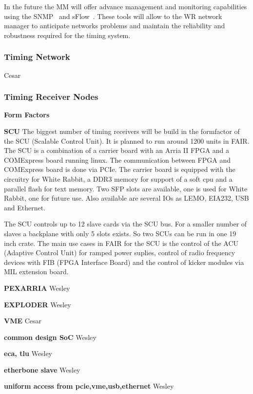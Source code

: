 In the future the MM will offer advance management and monitoring capabilities
using the SNMP~\cite{snmp} and sFlow~\cite{sflow}. These tools will allow to the 
WR network manager to anticipate networks problems and maintain the reliability
and robustness required for the timing system.


\subsubsection{Timing Network}

Cesar

\subsubsection{Timing Receiver Nodes}


\textbf{Form Factors}

\textbf{SCU}
The biggest number of timing receivers will be build in the formfactor
of the SCU (Scalable Control Unit).
It is planned to run around 1200 units in FAIR.
The SCU is a combination of a carrier board with an Arria II FPGA and a
COMExpress board running
linux. The communication between FPGA and COMExpress board is done via
PCIe. The carrier board is
equipped with the circuitry for White Rabbit, a DDR3 memory for support
of a soft cpu
and a parallel flash for text memory. Two SFP slots are available, one
is used for White Rabbit, one for future
use. Also available are several IOs as LEMO, EIA232, USB and Ethernet.

The SCU controls up to 12 slave cards via the SCU bus. For a smaller
number of slaves a backplane with
only 5 slots exists. So two SCUs can be run in one 19 inch crate.
The main use cases in FAIR for the SCU is the control of the ACU
(Adaptive Control Unit) for ramped power suplies,
control of radio frequency devices with FIB (FPGA Interface Board) and
the control of kicker modules
via MIL extension board.

\textbf{PEXARRIA}
Wesley

\textbf{EXPLODER}
Wesley

\textbf{VME}
Cesar


\textbf{common design SoC}
Wesley


\textbf{eca, tlu}
Wesley


\textbf{etherbone slave}
Wesley


\textbf{uniform access from pcie,vme,usb,ethernet}
Wesley


